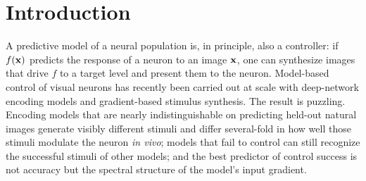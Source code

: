 
\section{Introduction}
A predictive model of a neural population is, in principle, also a controller: if $f(\mathbf{x})$ predicts the response of a neuron to an image $\mathbf{x}$, one can synthesize images that drive $f$ to a target level and present them to the neuron. Model-based control of visual neurons has recently been carried out at scale with deep-network encoding models and gradient-based stimulus synthesis. The result is puzzling. Encoding models that are nearly indistinguishable on predicting held-out natural images generate visibly different stimuli and differ several-fold in how well those stimuli modulate the neuron \textit{in vivo}; models that fail to control can still recognize the successful stimuli of other models; and the best predictor of control success is not accuracy but the spectral structure of the model's input gradient.

